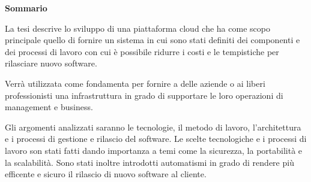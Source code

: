 \begin{center}
    \textbf{Sommario}
\end{center}
{\itshape{
    La tesi descrive lo sviluppo di una piattaforma cloud che ha come scopo principale quello di fornire un sistema in cui sono stati definiti
    dei componenti e dei processi di lavoro con cui è possibile ridurre i costi e le tempistiche per rilasciare nuovo software.

    Verrà utilizzata come fondamenta per fornire a delle aziende o ai liberi
    professionisti una infrastruttura in grado di supportare le loro operazioni di management e business.

    Gli argomenti analizzati saranno le tecnologie, il metodo di lavoro, l'architettura e i processi di gestione e rilascio del software.
    Le scelte tecnologiche e i processi di lavoro son stati fatti dando importanza a temi come la sicurezza, la portabilità e la scalabilità.
    Sono stati inoltre introdotti automatismi in grado di rendere più efficente e sicuro il rilascio di nuovo software al cliente.
}}